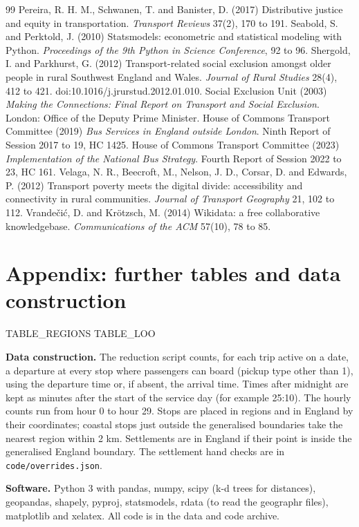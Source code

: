 \documentclass[11pt,a4paper]{article}
\begin{document}
\begin{thebibliography}{99}
 Pereira, R. H. M., Schwanen, T. and Banister, D. (2017) Distributive justice and equity in transportation. \textit{Transport Reviews} 37(2), 170 to 191.
 Seabold, S. and Perktold, J. (2010) Statsmodels: econometric and statistical modeling with Python. \textit{Proceedings of the 9th Python in Science Conference}, 92 to 96.
 Shergold, I. and Parkhurst, G. (2012) Transport-related social exclusion amongst older people in rural Southwest England and Wales. \textit{Journal of Rural Studies} 28(4), 412 to 421. doi:10.1016/j.jrurstud.2012.01.010.
 Social Exclusion Unit (2003) \textit{Making the Connections: Final Report on Transport and Social Exclusion}. London: Office of the Deputy Prime Minister.
 House of Commons Transport Committee (2019) \textit{Bus Services in England outside London}. Ninth Report of Session 2017 to 19, HC 1425.
 House of Commons Transport Committee (2023) \textit{Implementation of the National Bus Strategy}. Fourth Report of Session 2022 to 23, HC 161.
 Velaga, N. R., Beecroft, M., Nelson, J. D., Corsar, D. and Edwards, P. (2012) Transport poverty meets the digital divide: accessibility and connectivity in rural communities. \textit{Journal of Transport Geography} 21, 102 to 112.
 Vrande\v{c}i\'c, D. and Kr\"otzsch, M. (2014) Wikidata: a free collaborative knowledgebase. \textit{Communications of the ACM} 57(10), 78 to 85.
\end{thebibliography}

\appendix
\section{Appendix: further tables and data construction}
{{TABLE_REGIONS}}
{{TABLE_LOO}}

\textbf{Data construction.} The reduction script counts, for each trip active on a date, a departure at every stop where passengers can board (pickup type other than 1), using the departure time or, if absent, the arrival time. Times after midnight are kept as minutes after the start of the service day (for example 25:10). The hourly counts run from hour 0 to hour 29. Stops are placed in regions and in England by their coordinates; coastal stops just outside the generalised boundaries take the nearest region within 2 km. Settlements are in England if their point is inside the generalised England boundary. The settlement hand checks are in \texttt{code/overrides.json}.

\textbf{Software.} Python 3 with pandas, numpy, scipy (k-d trees for distances), geopandas, shapely, pyproj, statsmodels, rdata (to read the geographr files), matplotlib and xelatex. All code is in the data and code archive.
\end{document}
